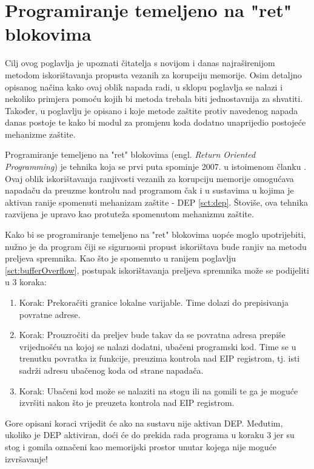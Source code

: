 \documentclass[times, utf8, diplomski, numeric]{fer}
\begin{document}
 
\section{Programiranje temeljeno na "ret" blokovima}
\label{sct:rop}

Cilj ovog poglavlja je upoznati čitatelja s novijom i danas
najraširenijom metodom iskorištavanja propusta vezanih za
korupciju memorije. Osim detaljno opisanog načina kako ovaj oblik
napada radi, u sklopu poglavlja se nalazi i nekoliko primjera
pomoću kojih bi metoda trebala biti jednostavnija za shvatiti.
Također, u poglavlju je opisano i koje metode zaštite protiv
navedenog napada danas postoje te kako bi modul za promjenu koda
dodatno unaprijedio postojeće mehanizme zaštite.

Programiranje temeljeno na "ret" blokovima (engl. \emph{Return
Oriented Programming}) je tehnika koja se prvi puta spominje
2007. u istoimenom članku \citep{rop_official}. Ovaj oblik
iskorištavanja ranjivosti vezanih za korupciju memorije omogućava
napadaču da preuzme kontrolu nad programom čak i u sustavima u
kojima je aktivan ranije spomenuti mehanizam zaštite - DEP 
\ref{sct:dep}. Štoviše, ova tehnika razvijena je upravo kao
protuteža spomenutom mehanizmu zaštite.

Kako bi se programiranje temeljeno na "ret" blokovima uopće moglo
upotrijebiti, nužno je da program čiji se sigurnosni propust
iskorištava bude ranjiv na metodu preljeva spremnika. Kao što je
spomenuto u ranijem poglavlju \ref{sct:bufferOverflow}, postupak
iskorištavanja preljeva spremnika može se podijeliti u 3 koraka:

\begin{enumerate}
\item Korak: Prekoračiti granice lokalne varijable. Time dolazi
do prepisivanja povratne adrese.
\item Korak: Prouzročiti da preljev bude takav da se povratna
adresa prepiše vrijednošću na kojoj se nalazi dodatni, ubačeni 
programski kod. Time se u trenutku povratka iz funkcije, preuzima kontrola
nad EIP registrom, tj. isti sadrži adresu ubačenog koda od strane
napadača.
\item Korak: Ubačeni kod može se nalaziti na stogu ili na gomili
te ga je moguće izvršiti nakon što je preuzeta kontrola nad EIP
registrom.
\end{enumerate}

Gore opisani koraci vrijedit će ako na sustavu nije aktivan
DEP. Međutim, ukoliko je DEP aktiviran, doći će do prekida rada
programa u koraku 3 jer su stog i gomila označeni kao memorijski
prostor unutar kojega nije moguće izvršavanje!
\end{document}
